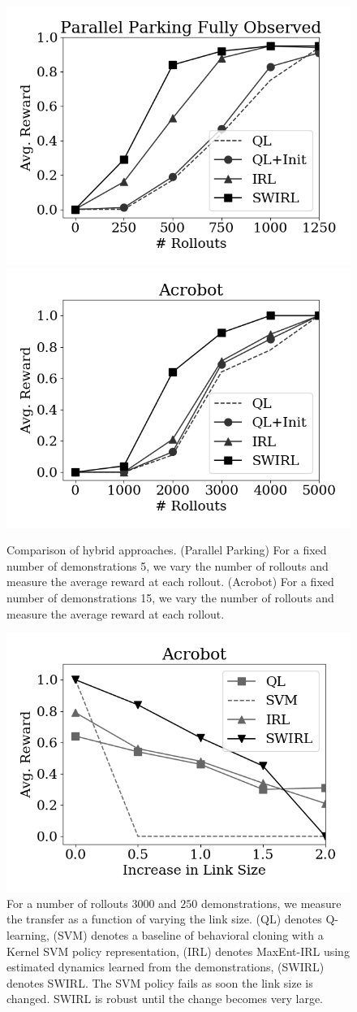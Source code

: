 \begin{figure}[ht!]
\centering
 \includegraphics[width=0.48\columnwidth]{swirl-experiments/ppfo-irl1.png}
 \includegraphics[width=0.48\columnwidth]{swirl-experiments/ppfo-irl2.png}
 \caption{Comparison of hybrid approaches. (Parallel Parking) For a fixed number of demonstrations 5, we vary the number of rollouts and measure the average reward at each rollout.  (Acrobot) For a fixed number of demonstrations 15, we vary the number of rollouts and measure the average reward at each rollout. \label{exp:hyb}}
\end{figure}

\begin{figure}[t]
\centering
 \includegraphics[width=0.8\columnwidth]{swirl-experiments/acr3.png}
 \caption{For a number of rollouts $3000$ and $250$ demonstrations, we measure the transfer as a function of varying the link size. (QL) denotes Q-learning, (SVM) denotes a baseline of behavioral cloning with a Kernel SVM policy representation, (IRL) denotes MaxEnt-IRL using estimated dynamics learned from the demonstrations, (SWIRL) denotes SWIRL. The SVM policy fails as soon the link size is changed. SWIRL is robust until the change becomes very large.  \label{exp:acr3}}
\end{figure}


